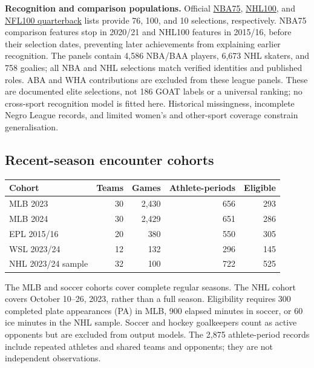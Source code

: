 \documentclass[11pt,letterpaper]{article}
\newcommand{\src}[2]{\href{#1}{#2}}
\begin{document}
\textbf{Recognition and comparison populations.}
Official \src{https://www.nba.com/news/nba-75th-anniversary-team-announced}{NBA75}, \src{https://www.nhl.com/news/100-greatest-nhl-players-complete-list-286199184}{NHL100}, and \src{https://www.nfl.com/news/nfl-100-all-time-team-quarterbacks-announced-0ap3000001091949}{NFL100 quarterback} lists provide 76, 100, and 10 selections, respectively.
NBA75 comparison features stop in 2020/21 and NHL100 features in 2015/16, before their selection dates, preventing later achievements from explaining earlier recognition.
The panels contain 4,586 NBA/BAA players, 6,673 NHL skaters, and 758 goalies; all NBA and NHL selections match verified identities and published roles.
ABA and WHA contributions are excluded from these league panels.
These are documented elite selections, not 186 GOAT labels or a universal ranking; no cross-sport recognition model is fitted here.
Historical missingness, incomplete Negro League records, and limited women's and other-sport coverage constrain generalisation.

\subsection{Recent-season encounter cohorts}

\begin{center}
\small
\begin{tabular}{@{}lrrrr@{}}
\toprule
Cohort & Teams & Games & Athlete-periods & Eligible \\
\midrule
MLB 2023 & 30 & 2,430 & 656 & 293 \\
MLB 2024 & 30 & 2,429 & 651 & 286 \\
EPL 2015/16 & 20 & 380 & 550 & 305 \\
WSL 2023/24 & 12 & 132 & 296 & 145 \\
NHL 2023/24 sample & 32 & 100 & 722 & 525 \\
\bottomrule
\end{tabular}
\end{center}

The MLB and soccer cohorts cover complete regular seasons.
The NHL cohort covers October 10--26, 2023, rather than a full season.
Eligibility requires 300 completed plate appearances (PA) in MLB, 900 elapsed minutes in soccer, or 60 ice minutes in the NHL sample.
Soccer and hockey goalkeepers count as active opponents but are excluded from output models.
The 2,875 athlete-period records include repeated athletes and shared teams and opponents; they are not independent observations.
\end{document}
